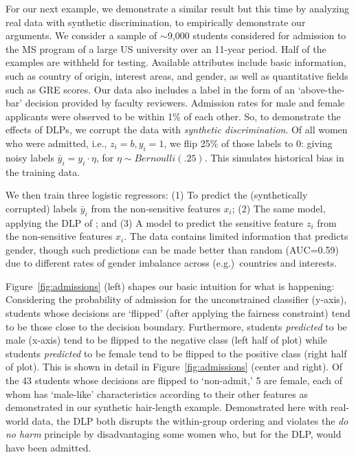 For our next example,
we demonstrate a similar result 
but this time by analyzing real data 
with synthetic discrimination, to empirically demonstrate our arguments.
We consider a sample of $\sim$9,000 students 
considered for admission 
to the MS program 
of a large US university
over an 11-year period.
Half of the examples are withheld for testing. 
Available attributes include
basic information, 
such as country of origin, interest areas, 
and gender, 
as well as quantitative fields 
such as GRE scores. 
Our data also includes a label 
in the form of an `above-the-bar' decision 
provided by faculty reviewers.
%
Admission rates for male and female applicants 
were observed to be within 1\% of each other.
So, to demonstrate the effects of DLPs, 
we corrupt the data with \emph{synthetic discrimination}.
Of all women who were admitted, i.e., $z_i = b, y_i = 1$,
we flip 25\% of those labels to $0$:
giving noisy labels $\bar{y}_i = y_i \cdot \eta$, 
for $\eta \sim \textit{Bernoulli}(.25)$.
This simulates %
historical bias in the training data.

We then train three logistic regressors: 
(1) To predict the (synthetically corrupted) labels $\bar y_i$
from the non-sensitive features 
$x_i$; 
(2) The same model, applying the DLP of \citep{zafar2017fairness}; and 
(3) A model 
to predict the sensitive feature  $z_i$
from the non-sensitive features $x_i$. 
The data contains limited information 
that predicts gender, 
though such predictions can be made better 
than random (AUC=0.59) 
due to different rates of gender imbalance 
across (e.g.)~countries and interests.



Figure~\ref{fig:admissions} (left) shapes 
our basic intuition for what is happening:
Considering the probability of admission 
for the unconstrained classifier (y-axis), 
students whose decisions are `flipped' 
(after applying the fairness constraint)
tend to be those close to the decision boundary. 
Furthermore, students \emph{predicted} to be male (x-axis)
tend to be flipped to the negative class 
(left half of plot) 
while students \emph{predicted} to be female 
tend to be flipped to the positive class 
(right half of plot). 
This is shown in detail 
in Figure~\ref{fig:admissions} (center and right). 
Of the 43 students whose decisions are flipped to `non-admit,' 5 are female, 
each of whom has `male-like' characteristics 
according to their other features
as demonstrated in our synthetic hair-length example.
Demonstrated here with real-world data,
the DLP both disrupts the within-group ordering
and violates the \emph{do no harm} principle 
by disadvantaging some women who, but for the DLP, 
would have been admitted. 

